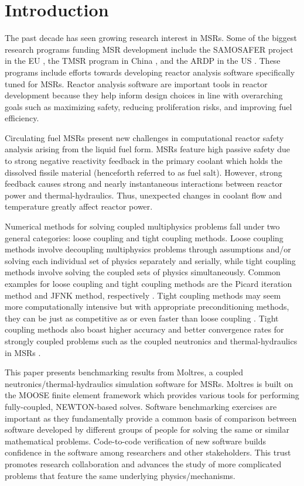 \section{Introduction}

The past decade has seen growing research interest in \glspl{MSR}. Some of the
biggest research programs funding \gls{MSR} development include the
\gls{SAMOSAFER} project in the EU \cite{cordis_severe_nodate}, the TMSR
program in China \cite{dai_17_2017}, and the \gls{ARDP} in the US
\cite{office_of_nuclear_energy_advanced_nodate}. These programs include
efforts towards developing
reactor analysis software specifically tuned for \glspl{MSR}. Reactor
analysis software are important tools in reactor development because
they help inform design choices in line with overarching goals such as
maximizing safety, reducing proliferation risks, and improving fuel
efficiency.

Circulating fuel \glspl{MSR} present new challenges in computational reactor
safety analysis arising from the liquid fuel form. \glspl{MSR} feature high
passive safety due to strong negative reactivity feedback in the primary
coolant which holds the dissolved fissile material (henceforth referred to as
fuel salt). However, strong feedback causes strong and nearly instantaneous
interactions between reactor power and thermal-hydraulics. Thus, unexpected
changes in coolant flow and temperature greatly affect reactor power.

Numerical methods for solving coupled multiphysics problems fall under two
general categories: loose coupling and tight coupling methods. Loose coupling
methods involve decoupling multiphysics problems through assumptions and/or
solving each individual set of physics separately and serially, while tight
coupling methods involve solving the coupled sets of physics simultaneously.
Common examples for loose coupling and tight coupling methods are the
Picard iteration method and \gls{JFNK} method, respectively
\cite{wang_review_2020}. Tight coupling methods may seem more computationally
intensive but with appropriate preconditioning methods, they can be just as
competitive as or even faster than loose coupling \cite{wang_review_2020}.
Tight coupling methods also boast higher accuracy and better convergence rates
for strongly coupled problems such as the coupled neutronics and
thermal-hydraulics in \glspl{MSR} \cite{lindsay_introduction_2018}.

This paper presents benchmarking results from Moltres, a coupled
neutronics/thermal-hydraulics simulation software for \glspl{MSR}. Moltres is
built on the \gls{MOOSE} \cite{gaston_physics-based_2015} finite element
framework which provides various tools for performing fully-coupled,
NEWTON-based solves. Software benchmarking exercises are important as they
fundamentally provide a common basis of comparison between software developed
by different groups of people for solving the same or similar mathematical
problems. Code-to-code verification of new software builds confidence in the
software among researchers and other stakeholders. This trust promotes
research collaboration and advances the study of more complicated problems that
feature the same underlying physics/mechanisms.
